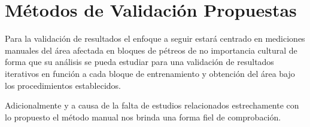 \section{Métodos de Validación Propuestas}


Para la validación de resultados el enfoque a seguir estará centrado en mediciones manuales del área afectada en bloques de pétreos de no importancia cultural de forma que su análisis se pueda estudiar para una validación de resultados iterativos en función a cada bloque de entrenamiento y obtención del área bajo los procedimientos establecidos.

Adicionalmente y a causa de la falta de estudios relacionados estrechamente con lo propuesto el método manual nos brinda una forma fiel de comprobación.


 

